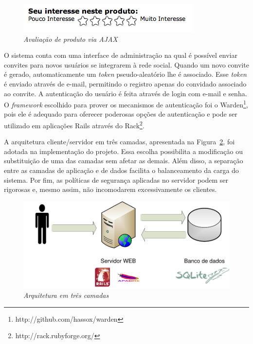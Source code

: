 \begin{figure}
 \centering
 \includegraphics{imagens/rater-ajax}
 \caption{\it Avaliação de produto via AJAX}
 \label{fig:rater-ajax}
\end{figure}

O sistema conta com uma interface de administração na qual é possível enviar convites para novos usuários se integrarem à rede social. Quando um novo convite é gerado, automaticamente um \emph{token} pseudo-aleatório lhe é associado. Esse \emph{token} é enviado através de e-mail, permitindo o registro apenas do convidado associado ao convite. A autenticação do usuário é feita através de login com e-mail e senha. O \emph{framework} escolhido para prover os mecanismos de autenticação foi o Warden\footnote{http://github.com/hassox/warden}, pois ele é adequado para oferecer poderosas opções de autenticação e pode ser utilizado em aplicações Rails através do Rack\footnote{http://rack.rubyforge.org/}.

A arquitetura cliente/servidor em três camadas, apresentada na Figura~\ref{fig:three_tier}, foi adotada na implementação do projeto. Essa escolha possibilita a modificação ou substituição de uma das camadas sem afetar as demais. Além disso, a separação entre as camadas de aplicação e de dados facilita o balanceamento da carga do sistema. Por fim, as políticas de segurança aplicadas no servidor podem ser rigorosas e, mesmo assim, não incomodarem excessivamente os clientes.

\begin{figure}
 \centering
 \includegraphics[width=\textwidth]{imagens/Implementacao_Detalhe}
 \caption{\it Arquitetura em três camadas}
 \label{fig:three_tier}
\end{figure}


